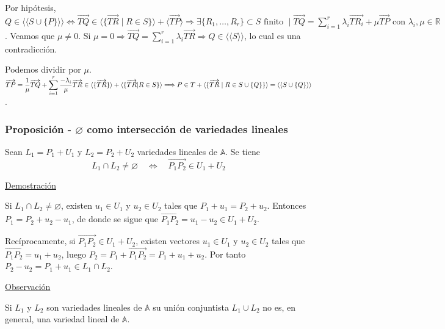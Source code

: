 \documentclass[12pt, a4paper, ones, notitlepage, openany,titlepage]{article}
\begin{document}
\begin{enumerate}[label=(\alph*)]
	Por hipótesis, $\displaystyle Q \in \langle\langle S \cup \{P\}\rangle\rangle \Longleftrightarrow \overrightarrow{TQ} \in \langle \{\overrightarrow{TR} \mid R \in S\} \rangle + \langle \overrightarrow{TP} \rangle \Longrightarrow \exists \{R_1,\ldots,R_r\} \subset S \text{ finito } \mid \overrightarrow{TQ} = \sum_{i = 1}^{r} \lambda_i \overrightarrow{TR_i} + \mu \overrightarrow{TP} \text{ con } \lambda_i, \mu \in \mathbb{R}$. Veamos que $\displaystyle \mu \neq 0$. Si $\displaystyle \mu = 0 \Longrightarrow \overrightarrow{TQ} = \sum_{i = 1}^{r} \lambda_i \overrightarrow{TR} \Longrightarrow Q \in \langle\langle S \rangle\rangle$, lo cual es una contradicción.
	
	Podemos dividir por $\mu$. $\displaystyle \overrightarrow{TP} = \frac{1}{\mu} \overrightarrow{TQ} + \sum_{i = 1}^{r} \frac{-\lambda_i}{\mu} \overrightarrow{TR} \in \langle \{\overrightarrow{TR}\} \rangle + \langle \{\overrightarrow{TR} | R \in S\} \rangle \Longrightarrow \\ P \in T + \langle \{\overrightarrow{TR} \mid R \in S \cup \{Q\}\} \rangle = \langle\langle S \cup \{Q\} \rangle\rangle$.
\end{enumerate}

\subsubsection{Proposición - $\varnothing$ como intersección de variedades lineales}
\noindent Sean $L_{1}=P_{1}+U_{1}$ y $L_{2}=P_{2}+U_{2}$ variedades lineales de $\mathbb{A}$. Se tiene
$$
L_{1} \cap L_{2} \neq \varnothing \quad \Longleftrightarrow \quad \overrightarrow{P_{1} P_{2}} \in U_{1}+U_{2}
$$

\noindent\underline{Demostración}

Si $L_{1} \cap L_{2} \neq \varnothing$, existen $u_{1} \in U_{1}$ y $u_{2} \in U_{2}$ tales que $P_{1}+u_{1}=P_{2}+u_{2}$. Entonces $P_{1}=P_{2}+u_{2}-u_{1}$, de donde se sigue que $\overrightarrow{P_{1} P_{2}}=u_{1}-u_{2} \in U_{1}+U_{2}$.

Recíprocamente, si $\overrightarrow{P_{1} P_{2}} \in U_{1}+U_{2}$, existen vectores $u_{1} \in U_{1}$ y $u_{2} \in U_{2}$ tales que $\overrightarrow{P_{1} P_{2}}=u_{1}+u_{2}$, luego $P_{2}=P_{1}+\overrightarrow{P_{1} P_{2}}=P_{1}+u_{1}+u_{2}$. Por tanto $P_{2}-u_{2}=P_{1}+u_{1} \in L_{1} \cap L_{2}$.

\noindent\underline{Observación}

Si $L_{1}$ y $L_{2}$ son variedades lineales de $\mathbb{A}$ su unión conjuntista $L_{1} \cup L_{2}$ no es, en general, una variedad lineal de $\mathbb{A}$.
\end{document}
